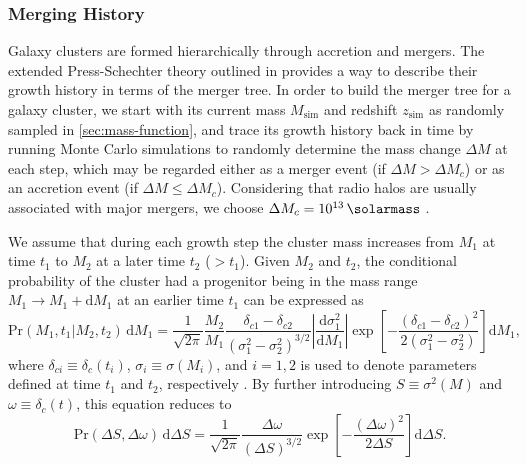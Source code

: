 \documentclass[modern]{aastex62}
\newcommand{\R}[1]{\mathrm{#1}}
\newcommand{\D}[1]{\R{d} #1}
\newcommand{\diff}[2]{\frac{\D{#1}}{\D{#2}}}
\begin{document}
\subsubsection{Merging History}
\label{sec:merging-history}

Galaxy clusters are formed hierarchically through accretion and mergers.
The extended Press-Schechter theory outlined in \citet{lacey1993} provides
a way to describe their growth history in terms of the merger tree.
In order to build the merger tree for a galaxy cluster, we start with
its current mass $M_{\R{sim}}$ and redshift $z_{\R{sim}}$ as randomly sampled
in \autoref{sec:mass-function}, and trace its growth history back in time
by running Monte Carlo simulations to randomly determine the mass change
$\Delta M$ at each step, which may be regarded either as a merger event
(if $\Delta M > \Delta M_c$) or as an accretion event
(if $\Delta M \leq \Delta M_c$).
Considering that radio halos are usually associated with major mergers,
we choose $\Delta M_c = \SI{e13}{\solarmass}$ \citep[e.g.,][]{cassano2005}.

We assume that during each growth step the cluster mass increases
from $M_1$ at time $t_1$ to $M_2$ at a later time $t_2$ ($> t_1$).
Given $M_2$ and $t_2$, the conditional probability of the cluster had
a progenitor being in the mass range $M_1 \to M_1 + \D{M_1}$ at an
earlier time $t_1$ can be expressed as
\begin{equation}
  \label{eq:eps-condprob}
  \R{Pr}(M_1, t_1 | M_2, t_2) \,\D{M_1} = \frac{1}{\sqrt{2\pi}}
  \frac{M_2}{M_1}
  \frac{\delta_{c1} - \delta_{c2}}{(\sigma_1^2 - \sigma_2^2)^{3/2}}
  \left| \diff{\sigma_1^2}{M_1} \right|
  \exp \!\left[ -\frac{(\delta_{c1} - \delta_{c2})^2}
    {2(\sigma_1^2 - \sigma_2^2)} \right] \D{M_1},
\end{equation}
where
$\delta_{ci} \equiv \delta_c(t_i)$, $\sigma_i \equiv \sigma(M_i)$, and $i =
1, 2$ is used to denote parameters defined at time $t_1$ and $t_2$,
respectively \citep{lacey1993,randall2002}.
By further introducing $S \equiv \sigma^2(M)$ and
$\omega \equiv \delta_c(t)$, this equation reduces to
\begin{equation}
  \label{eq:eps-condprob-simp}
  \R{Pr}(\Delta S, \Delta \omega) \,\D{\Delta S} = \frac{1}{\sqrt{2\pi}}
  \frac{\Delta\omega}{(\Delta S)^{3/2}}
  \exp \!\left[ -\frac{(\Delta\omega)^2}{2 \Delta S} \right] \D{\Delta S}.
\end{equation}
\end{document}
